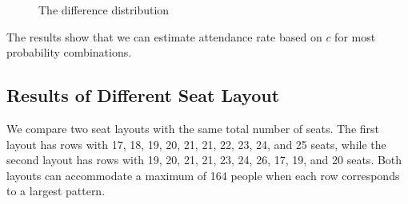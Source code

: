 \begin{figure}[ht]
  \centering
  \caption{The difference distribution}
  \label{Fig}
\end{figure}

The results show that we can estimate attendance rate based on $c$ for most probability combinations. 


\subsection{Results of Different Seat Layout}
We compare two seat layouts with the same total number of seats. The first layout has rows with 17, 18, 19, 20, 21, 21, 22, 23, 24, and 25 seats, while the second layout has rows with 19, 20, 21, 21, 23, 24, 26, 17, 19, and 20 seats. Both layouts can accommodate a maximum of 164 people when each row corresponds to a largest pattern.

